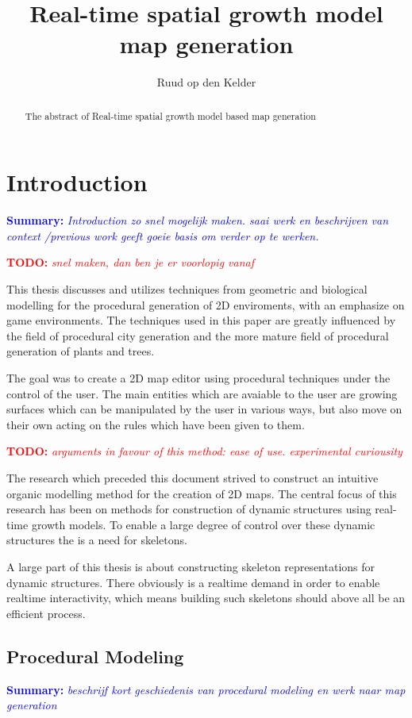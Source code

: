 \documentclass{article}
\title{Real-time spatial growth model map generation}
\author{Ruud op den Kelder}
\newcommand{\todo}[1]{\textcolor{red}{\textbf{\newline TODO: }\it{#1} \newline}}
\newcommand{\inhoud}[1]{\textcolor{blue}{\textbf{\newline Summary: }\it{#1}}}
\begin{document}
\maketitle

\begin{abstract}
The abstract of Real-time spatial growth model based map generation
\end{abstract}
\newpage 

\tableofcontents
\newpage 

\section{Introduction}
\inhoud{Introduction zo snel mogelijk maken. saai werk en beschrijven van context /previous work 
geeft goeie basis om verder op te werken. }

\todo{snel maken, dan ben je er voorlopig vanaf}

This thesis discusses and utilizes techniques from geometric and biological modelling for the procedural generation of 2D enviroments, with an emphasize on game environments. The techniques used in this paper are greatly influenced by the field of procedural city generation and the more mature field of procedural generation of plants and trees. 

The goal was to create a 2D map editor using procedural techniques under the control of the user. The main entities which are avaiable to the user are growing surfaces which can be manipulated by the user in various ways, but also move on their own acting on the rules which have been given to them. 

\todo{arguments in favour of this method: ease of use. experimental curiousity}


The research which preceded this document strived to construct an intuitive organic modelling method for the creation of 2D maps. The central focus of this research has been on methods for construction of dynamic structures using real-time growth models. To enable a large degree of control over these dynamic structures the is a need for skeletons. 

A large part of this thesis is about constructing skeleton representations for dynamic structures. There obviously is a realtime demand in order to enable realtime interactivity, which means building such skeletons should above all be an efficient process.    


\subsection{Procedural Modeling}
\inhoud{beschrijf kort geschiedenis van procedural modeling en werk naar map generation}
\end{document}
